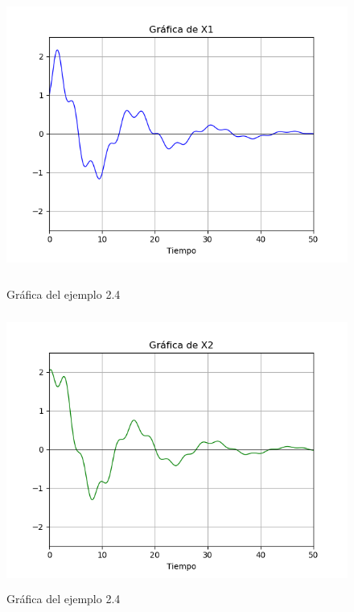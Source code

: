 \begin{figure}[h!]
	\begin{center}
        \includegraphics[height=9cm]{Ejem2_4-GrafC}
        \caption{Gráfica del ejemplo 2.4}

    	\includegraphics[height=9cm]{Ejem2_4-GrafD}
        \caption{Gráfica del ejemplo 2.4}
    \end{center}
\end{figure}

